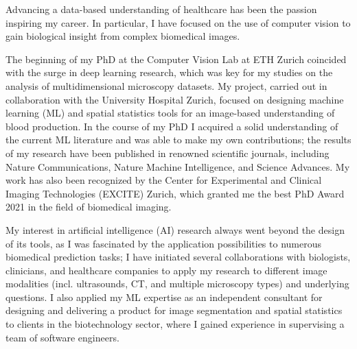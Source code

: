 \documentclass[10pt, letter]{ag-cv} %
\begin{document}
\makecvheader %

\makelettertitlenorec %


\begin{cvletter}






\begin{flushleft}
Advancing a data-based understanding of healthcare has been the passion inspiring my career. In particular, I have focused on the use of computer vision to gain biological insight from complex biomedical images. 

The beginning of my PhD at the Computer Vision Lab at ETH Zurich coincided with the surge in deep learning research, which was key for my studies on the analysis of multidimensional microscopy datasets. My project, carried out in collaboration with the University Hospital Zurich, focused on designing machine learning (ML) and spatial statistics tools for an image-based understanding of blood production. In the course of my PhD I acquired a solid understanding of the current ML literature and was able to make my own contributions; the results of my research have been published in renowned scientific journals, including Nature Communications, Nature Machine Intelligence, and Science Advances. My work has also been recognized by the Center for Experimental and Clinical Imaging Technologies (EXCITE) Zurich, which granted me the best PhD Award 2021 in the field of biomedical imaging. 

My interest in artificial intelligence (AI) research always went beyond the design of its tools, as I was fascinated by the application possibilities to numerous biomedical prediction tasks; I have initiated several collaborations with biologists, clinicians, and healthcare companies to apply my research to different image modalities (incl. ultrasounds, CT, and multiple microscopy types) and underlying questions. I also applied my ML expertise as an independent consultant for designing and delivering a product for image segmentation and spatial statistics to clients in the biotechnology sector, where I gained experience in supervising a team of software engineers.  
 

\end{flushleft}
\end{cvletter}
\end{document}
